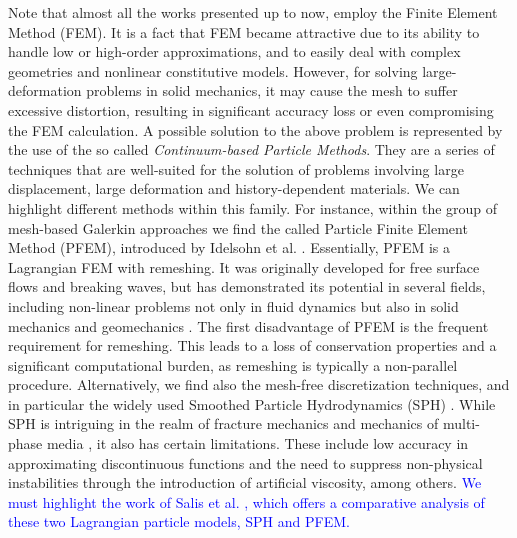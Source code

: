 \documentclass[11pt,english]{article}
\newcommand{\LM}[1]{\textcolor{blue}{#1}}
\begin{document}
Note that almost all the works presented up to now, employ the Finite Element Method (FEM). 
It is a fact that FEM became attractive due to its ability to handle low or high-order approximations, and to easily deal with complex geometries and nonlinear constitutive models. However, for solving large-deformation problems in solid mechanics, it may cause the mesh to suffer excessive distortion, resulting in significant accuracy loss or even compromising the FEM calculation. A possible solution to the above problem is represented by the use of the so called \textit{Continuum-based Particle Methods}. 
They are a series of techniques that are well-suited for the solution of problems involving large displacement, large deformation and history-dependent materials. 
We can highlight different methods within this family. For instance, within the group of mesh-based Galerkin approaches we find the called Particle Finite Element Method (PFEM), introduced by Idelsohn et al. \cite{idelsohn2004particle}. Essentially, PFEM is a Lagrangian FEM with remeshing. It was originally developed for free surface flows and breaking waves, but has  demonstrated its potential in several  fields, including non-linear problems \cite{cremonesi2020state} not only in fluid dynamics but also in solid mechanics \cite{oliver2007particle} and geomechanics \cite{carbonell2022geotechnical}. The first disadvantage of PFEM is the frequent requirement for remeshing. This leads to a loss of conservation properties and a significant computational burden, as remeshing is typically a non-parallel procedure. Alternatively, we find also the mesh-free discretization techniques, and in particular the widely used Smoothed Particle Hydrodynamics (SPH) \cite{gingold1977smoothed,gray2001sph}. While SPH is intriguing in the realm of fracture mechanics and mechanics of multi-phase media \cite{bui2008lagrangian, shutov2019application}, it also has certain limitations. These include low accuracy in approximating discontinuous functions and the need to suppress non-physical instabilities through the introduction of artificial viscosity, among others. \LM{We must highlight the work of Salis et al. \cite{salis2024lagrangian}, which offers a comparative analysis of these two Lagrangian particle models, SPH and PFEM.}
\end{document}
